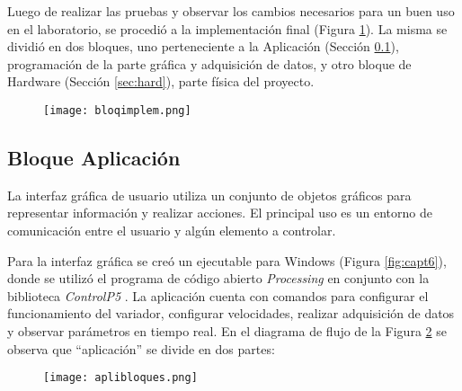 Luego de realizar las pruebas y observar los cambios necesarios para un buen uso en el laboratorio, se procedió a la implementación final (Figura \ref{fig:implebloq}). La misma se dividió en dos bloques, uno perteneciente a la Aplicación (Sección \ref{sec:aplic}), programación de la parte gráfica y adquisición de datos, y otro bloque de Hardware (Sección \ref{sec:hard}), parte física del proyecto. 


\begin{figure}[h!]
	\centering
	\texttt{[image: bloqimplem.png]}
	\label{fig:implebloq}
\end{figure}





\subsection{Bloque Aplicación} 	\label{sec:aplic}
\begin{tcolorbox}[colback=blue!5!white,colframe=blue!75!black,title=GUI]
	La interfaz gráfica de usuario utiliza un conjunto de objetos gráficos para representar información y realizar acciones. El principal uso es un entorno de comunicación entre el usuario y algún elemento a controlar.
\end{tcolorbox}

Para la interfaz gráfica se creó un ejecutable para Windows (Figura \ref{fig:capt6}), donde se utilizó el programa de código abierto \textit{Processing} en conjunto con la biblioteca \textit{ControlP5} \cite{controlp5}. La aplicación cuenta con comandos para configurar el funcionamiento del variador, configurar velocidades, realizar adquisición de datos y observar parámetros en tiempo real.
En el diagrama de flujo de la Figura \ref{fig:bloqvis} se observa que “aplicación” se divide en dos partes: 

\begin{figure}[H]
	\centering
	\texttt{[image: aplibloques.png]}
	\label{fig:bloqvis}
\end{figure}

